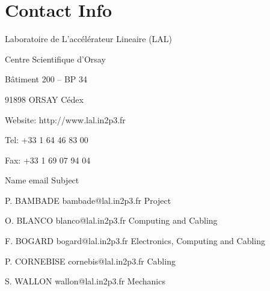 \section{Contact Info}
Laboratoire de L'accélérateur Lineaire (LAL)\par 
Centre Scientifique d'Orsay\par 
Bâtiment 200 – BP 34\par 
91898 ORSAY Cédex\par 
Website: http://www.lal.in2p3.fr\par 
Tel: 	+33 1 64 46 83 00\par 
Fax: 	+33 1 69 07 94 04\par 

Name			email				Subject\par 
P. BAMBADE	bambade@lal.in2p3.fr	Project\par 
O. BLANCO		blanco@lal.in2p3.fr	Computing and Cabling\par 
F. BOGARD		bogard@lal.in2p3.fr	Electronics, Computing and Cabling\par 
P. CORNEBISE	cornebis@lal.in2p3.fr	Cabling\par 
S. WALLON		wallon@lal.in2p3.fr	Mechanics\par
